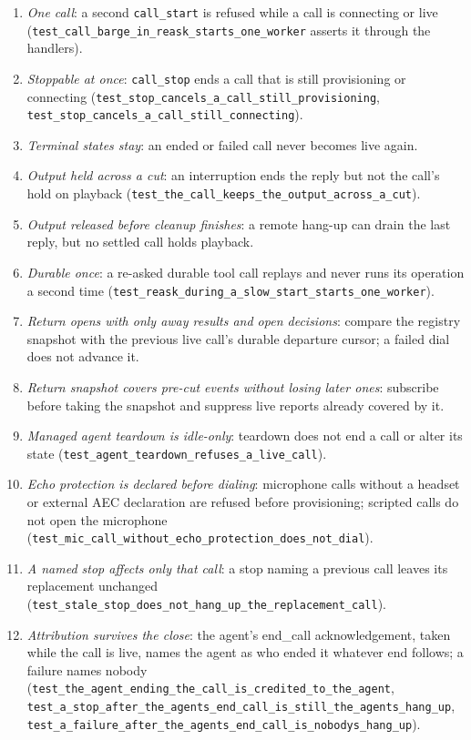 \documentclass[a4paper,10pt,fleqn]{article}
\begin{document}
\begin{enumerate}
  \item[C1] \emph{One call}: a second \texttt{call\_start} is refused while a
    call is connecting or live (\texttt{test\_call\_barge\_in\_reask\_starts\_one\_worker}
    asserts it through the handlers).
  \item[C2] \emph{Stoppable at once}: \texttt{call\_stop} ends a call that is
    still provisioning or connecting
    (\texttt{test\_stop\_cancels\_a\_call\_still\_provisioning},
    \texttt{test\_stop\_cancels\_a\_call\_still\_connecting}).
  \item[C3] \emph{Terminal states stay}: an ended or failed call never
    becomes live again.
  \item[C4] \emph{Output held across a cut}: an interruption ends the reply
    but not the call's hold on playback
    (\texttt{test\_the\_call\_keeps\_the\_output\_across\_a\_cut}).
  \item[C5] \emph{Output released before cleanup finishes}: a remote hang-up
    can drain the last reply, but no settled call holds playback.
  \item[C6] \emph{Durable once}: a re-asked durable tool call replays and
    never runs its operation a second time
    (\texttt{test\_reask\_during\_a\_slow\_start\_starts\_one\_worker}).
  \item[C7] \emph{Return opens with only away results and open decisions}:
    compare the registry snapshot with the previous live call's durable departure
    cursor; a failed dial does not advance it.
  \item[C8] \emph{Return snapshot covers pre-cut events without losing later ones}:
    subscribe before taking the snapshot and suppress live reports already
    covered by it.
  \item[C9] \emph{Managed agent teardown is idle-only}: teardown does not
    end a call or alter its state
    (\texttt{test\_agent\_teardown\_refuses\_a\_live\_call}).
  \item[C10] \emph{Echo protection is declared before dialing}: microphone
    calls without a headset or external AEC declaration are refused before
    provisioning; scripted calls do not open the microphone
    (\texttt{test\_mic\_call\_without\_echo\_protection\_does\_not\_dial}).
  \item[C11] \emph{A named stop affects only that call}: a stop naming a
    previous call leaves its replacement unchanged
    (\texttt{test\_stale\_stop\_does\_not\_hang\_up\_the\_replacement\_call}).
  \item[C12] \emph{Attribution survives the close}: the agent's end\_call
    acknowledgement, taken while the call is live, names the agent as who
    ended it whatever end follows; a failure names nobody
    (\texttt{test\_the\_agent\_ending\_the\_call\_is\_credited\_to\_the\_agent},
    \texttt{test\_a\_stop\_after\_the\_agents\_end\_call\_is\_still\_the\_agents\_hang\_up},
    \texttt{test\_a\_failure\_after\_the\_agents\_end\_call\_is\_nobodys\_hang\_up}).
\end{enumerate}
\end{document}
